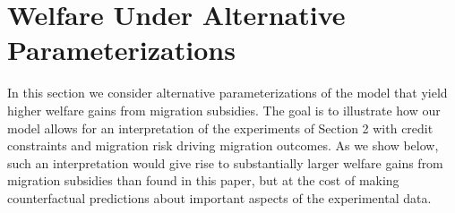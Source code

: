 \documentclass[12pt,pdftex]{article}
\def\thesection{\arabic{section}}
\begin{document}
%
%
%

\clearpage
\newpage

\setcounter{figure}{0}
\setcounter{table}{0}


\section{Welfare Under Alternative Parameterizations} \label{sec:alt_welfare}

In this section we consider alternative parameterizations of the model that yield higher welfare gains from migration subsidies. The goal is to illustrate how our model allows for an interpretation of the experiments of Section 2 with credit constraints and migration risk driving migration outcomes. As we show below, such an interpretation would give rise to substantially larger welfare gains from migration subsidies than found in this paper, but at the cost of making counterfactual predictions about important aspects of the experimental data.
\end{document}
